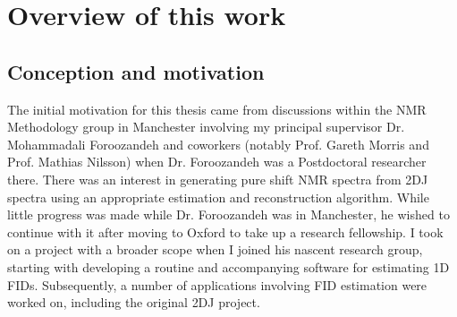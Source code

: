 \section{Overview of this work}

\subsection{Conception and motivation}
The initial motivation for this thesis came from discussions within the NMR
Methodology group in Manchester involving my principal
supervisor Dr. Mohammadali Foroozandeh and coworkers (notably Prof. Gareth
Morris and Prof. Mathias Nilsson) when Dr. Foroozandeh was a Postdoctoral
researcher there. There was an interest in generating pure shift \ac{NMR}
spectra from \acs{2DJ} spectra using an appropriate estimation and
reconstruction algorithm. While little progress was made while Dr. Foroozandeh
was in Manchester, he wished to continue with it after moving to Oxford to take
up a research fellowship. I took on a project with a broader scope
when I joined his nascent research group, starting with developing a routine
and accompanying software for estimating \ac{1D} \acp{FID}. Subsequently, a
number of applications involving \ac{FID} estimation were worked on, including
the original \ac{2DJ} project.

